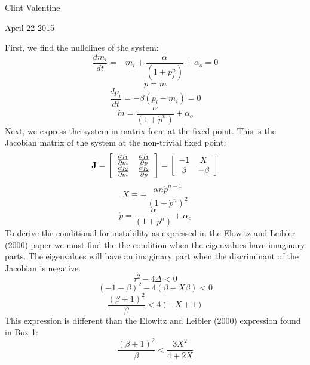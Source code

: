\documentclass{article}
\begin{document}
\noindent
Clint Valentine

\noindent
April 22 2015

\vfill

\noindent
First, we find the nullclines of the system:
$$\frac{dm_{i}}{dt}=-m_{i}+\frac{\alpha}{(1+p^{n}_{j})}+\alpha_{o}=0$$
$$\dot{p}=\dot{m}$$
$$\frac{dp_{i}}{dt}=-\beta(p_{i}-m_{i})=0$$
$$\dot{m}=\frac{\alpha}{(1 + \dot{p}^{n})}+\alpha_{o}$$
Next, we express the system in matrix form at the fixed point.
This is the Jacobian matrix of the system at the non-trivial fixed point:
$$
\mathbf{J}=
\left[{\begin{array}{*{20}c}
\frac{\partial{f_{1}}}{\partial{m}}&\frac{\partial{f_{1}}}{\partial{p}}\\
\frac{\partial{f_{2}}}{\partial{m}}&\frac{\partial{f_{2}}}{\partial{p}}
\end{array}}\right]=
\left[{\begin{array}{*{20}c}
-1&X\\
\beta&-\beta
\end{array}}\right]
$$
$$X\equiv-\frac{\alpha{}n\dot{p}^{n-1}}{(1+\dot{p}^n)^2}$$
$$\dot{p}=\frac{\alpha}{(1+\dot{p}^{n})}+\alpha_{o}$$
To derive the conditional for instability as expressed in the Elowitz and
Leibler (2000) paper we must find the the condition when the eigenvalues
have imaginary parts. The eigenvalues will have an imaginary part when
the discriminant of the Jacobian is negative.
$$\tau^{2}-4\Delta<0$$
$$(-1-\beta)^{2}-4(\beta-X\beta)<0$$
$$\frac{(\beta+1)^{2}}{\beta}<4(-X+1)$$
This expression is different than the Elowitz and Leibler (2000)
expression found in Box 1:
$$\frac{(\beta+1)^{2}}{\beta}<\frac{3X^{2}}{4+2X}$$

\vfill
\end{document}
